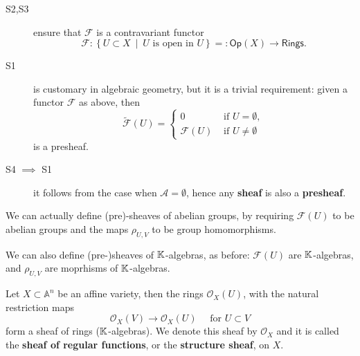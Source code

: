 \begin{rem}\leavevmode\vspace{-.2\baselineskip}
	\begin{description}
		\item[S2,S3] ensure that $\mathcal{F}$ is a contravariant functor
			\begin{equation}
				\mathcal{F}: \left\{ U \subset X \ \middle|\ U \text{ is open in } U \right\} =: \mathsf{Op}(X) \to \mathsf{Rings}
			.\end{equation} 
		\item[S1] is customary in algebraic geometry, but it is a trivial requirement:
			given a functor $\mathcal{F}$ as above, then
			\begin{equation}
				\widetilde{\mathcal{F}}(U) =
				\begin{cases}
					0 & \text{ if } U = \emptyset,\\
					\mathcal{F}(U) & \text{ if } U \neq \emptyset
				\end{cases} 
			\end{equation} 
			is a presheaf.
		\item[S4 $\implies$ S1] it follows from the case when $\mathcal{A} = \emptyset$, hence any \textbf{sheaf} is also a \textbf{presheaf}.
	\end{description} 
\end{rem}

\begin{rem}
	We can actually define (pre)-sheaves of abelian groups, by requiring  $\mathcal{F}(U)$ to be abelian groups and the maps $\rho_{U,V}$ to be group homomorphisms.
\end{rem}
\begin{rem}
	We can also define (pre-)sheaves of $\mathbb{K}$-algebras, as before:
	$\mathcal{F}(U)$ are $\mathbb{K}$-algebras, and $\rho_{U,V}$ are moprhisms of $\mathbb{K}$-algebras.
\end{rem}

\begin{ex}
	Let $X \subset \mathbb{A}^n$ be an affine variety, then the rings $\mathcal{O}_X(U)$, with the natural restriction maps
	\begin{equation}
		\mathcal{O}_X(V) \to \mathcal{O}_X(U) \quad \text{ for } U \subset V
	\end{equation} 
	form a sheaf of rings ($\mathbb{K}$-algebras).
	We denote this sheaf by $\mathcal{O}_X$ and it is called the \textbf{sheaf of regular functions}, or the \textbf{structure sheaf}, on $X$.
\end{ex} 

